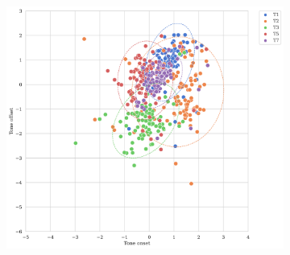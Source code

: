 \documentclass[12pt]{report}
\begin{document}
\begin{CJK}{UTF8}{bsmi}
\begin{figure}[hbt!]
\begin{subfigure}[b]{.8\textwidth}
\includegraphics[width=\textwidth]{Figures/Tone_space_Min.png}
\end{subfigure}


\end{figure}
\end{CJK}
\end{document}
